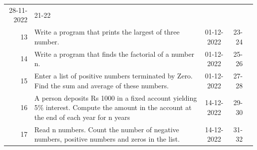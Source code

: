 \documentclass[oneside, a4paper]{memoir}
\begin{document}
{\begin{supertabular}{rp{8cm}crl}
        28-11-2022 &
        21-22 \\
      13 &
        Write a program that prints the largest of three number. &
        01-12-2022 &
        23-24 \\
      14 &
        Write a program that finds the factorial of a number n. &
        01-12-2022 &
        25-26 \\
      15 &
        Enter a list of positive numbers terminated by Zero. Find the sum and average of these numbers. &
        01-12-2022 &
        27-28 \\
      16 &
        A person deposits Rs 1000 in a fixed account yielding 5\% interest. Compute the amount in the account at the end of each year for n years &
        14-12-2022 &
        29-30 \\
      17 &
        Read n numbers. Count the number of negative numbers, positive numbers and zeros in the list. &
        14-12-2022 &
        31-32 \\
    \end{supertabular}
  }
\end{document}
